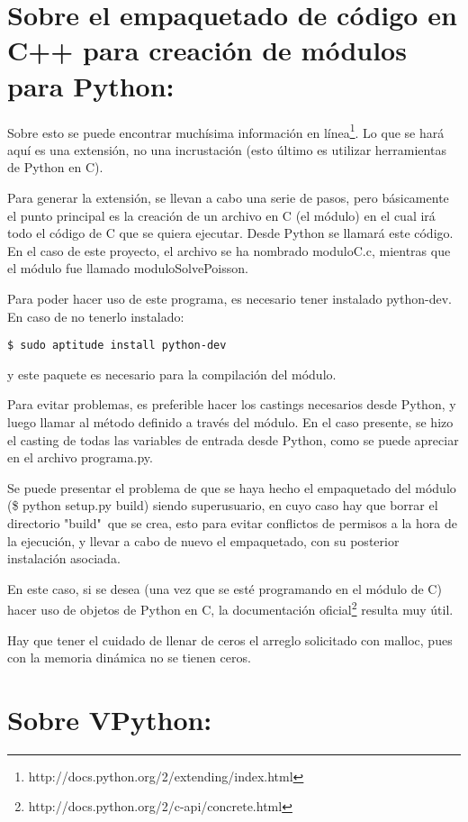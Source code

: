 \documentclass[letter]{article}
\begin{document}
\section{Sobre el empaquetado de código en C++ para creación de módulos para Python:}

Sobre esto se puede encontrar muchísima información en línea\footnote{http://docs.python.org/2/extending/index.html}. Lo que se hará aquí es una extensión, no una incrustación (esto último es utilizar herramientas de Python en C).

Para generar la extensión, se llevan a cabo una serie de pasos, pero básicamente el punto principal es la creación de un archivo en C (el módulo) en el cual irá todo el código de C que se quiera ejecutar. Desde Python se llamará este código. En el caso de este proyecto, el archivo se ha nombrado moduloC.c, mientras que el módulo fue llamado moduloSolvePoisson.

Para poder hacer uso de este programa, es necesario tener instalado python-dev. En caso de no tenerlo instalado:

\lstset{language=bash}
\begin{lstlisting}
$ sudo aptitude install python-dev
\end{lstlisting}

y este paquete es necesario para la compilación del módulo.

Para evitar problemas, es preferible hacer los castings necesarios desde Python, y luego llamar al método definido a través del módulo. En el caso presente, se hizo el casting de todas las variables de entrada desde Python, como se puede apreciar en el archivo programa.py.

Se puede presentar el problema de que se haya hecho el empaquetado del módulo (\$ python setup.py build) siendo superusuario, en cuyo caso hay que borrar el directorio "build"\ que se crea, esto para evitar conflictos de permisos a la hora de la ejecución, y llevar a cabo de nuevo el empaquetado, con su posterior instalación asociada.

En este caso, si se desea (una vez que se esté programando en el módulo de C) hacer uso de objetos de Python en C, la documentación oficial\footnote{http://docs.python.org/2/c-api/concrete.html} resulta muy útil.

Hay que tener el cuidado de llenar de ceros el arreglo solicitado con malloc, pues con la memoria dinámica no se tienen ceros.


\section{Sobre VPython:}
\end{document}
